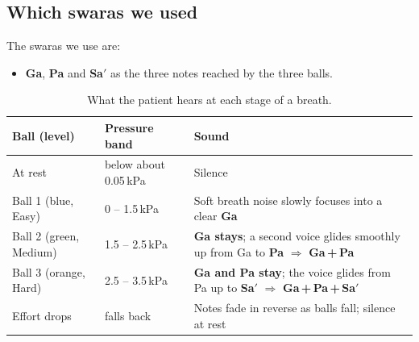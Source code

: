\documentclass[12pt,a4paper]{article}
\newcommand{\Sah}{Sa\ensuremath{'}}     %
\begin{document}
\subsection{Which swaras we used}
\label{sec:whichswaras}

The swaras we use are:
\begin{itemize}
  \item \textbf{Ga}, \textbf{Pa} and \textbf{\Sah} as the three notes reached by the three balls.
\end{itemize}

\begin{table}[H]
\centering
\caption{What the patient hears at each stage of a breath.}
\label{tab:musicmap}
\small
\begin{tabularx}{\linewidth}{@{}P{2.6cm} P{2.6cm} L@{}}
\toprule
\textbf{Ball (level)} & \textbf{Pressure band} & \textbf{Sound} \\
\midrule
At rest            & below about 0.05\,kPa   & Silence \\
Ball 1 (blue, Easy)& 0 -- 1.5\,kPa       & Soft breath noise slowly focuses into a clear \textbf{Ga} \\
Ball 2 (green, Medium) & 1.5 -- 2.5\,kPa & \textbf{Ga stays}; a second voice glides smoothly up from Ga to \textbf{Pa} $\Rightarrow$ \textbf{Ga\,+\,Pa} \\
Ball 3 (orange, Hard)  & 2.5 -- 3.5\,kPa & \textbf{Ga and Pa stay}; the voice glides from Pa up to \textbf{\Sah} $\Rightarrow$ \textbf{Ga\,+\,Pa\,+\,\Sah} \\
Effort drops       & falls back         & Notes fade in reverse as balls fall; silence at rest \\
\bottomrule
\end{tabularx}
\end{table}
\end{document}

